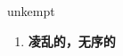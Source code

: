 
\begin{frame}
{\huge unkempt}
\begin{center}
\begin{enumerate}\Large
  \item \textbf{凌乱的，无序的}
\end{enumerate}
\end{center}
\end{frame}
